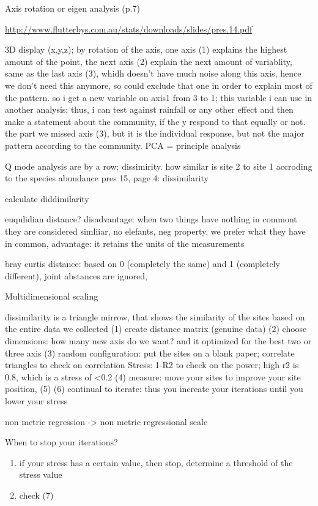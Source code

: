 \documentclass[]{article}
\providecommand{\tightlist}{%
  \setlength{\itemsep}{0pt}\setlength{\parskip}{0pt}}
\begin{document}
Axis rotation or eigen analysis (p.7)

\url{http://www.flutterbys.com.au/stats/downloads/slides/pres.14.pdf}

3D display (x,y,z); by rotation of the axis, one axis (1) explains the
highest amount of the point, the next axis (2) explain the next amount
of variablity, same as the last axis (3), whidh doesn't have much noise
along this axis, hence we don't need this anymore, so could exclude that
one in order to explain most of the pattern. so i get a new variable on
axis1 from 3 to 1; this variable i can use in another analysis; thus, i
can test against rainfall or any other effect and then make a statement
about the community, if the y respond to that equally or not. the part
we missed axis (3), but it is the individual response, but not the major
pattern according to the community. PCA = principle analysis

Q mode analysis are by a row; dissimirity. how similar is site 2 to site
1 accroding to the species abundance pres 15, page 4: dissimilarity

calculate diddimilarity

euqulidian distance? disadvantage: when two things have nothing in
commont they are considered simliiar, no elefants, neg property, we
prefer what they have in common, advantage: it retains the units of the
measurements

bray curtis distance: based on 0 (completely the same) and 1 (completely
different), joint abstances are ignored,

Multidimensional scaling

dissimilarity is a triangle mirrow, that shows the similarity of the
sites based on the entire data we collected (1) create distance matrix
(genuine data) (2) choose dimensions: how many new axis do we want? and
it optimized for the best two or three axis (3) random configuration:
put the sites on a blank paper; correlate triangles to check on
correlation Stress: 1-R2 to check on the power; high r2 is 0.8, which is
a stress of \textless{}0.2 (4) measure: move your sites to improve your
site position, (5) (6) continual to iterate: thus you increate your
iterations until you lower your stress

non metric regression -\textgreater{} non metric regressional scale

When to stop your iterations?

\begin{enumerate}
\def\labelenumi{(\arabic{enumi})}
\tightlist
\item
  if your stress has a certain value, then stop, determine a threshold
  of the stress value
\item
  check (7)
\end{enumerate}
\end{document}
